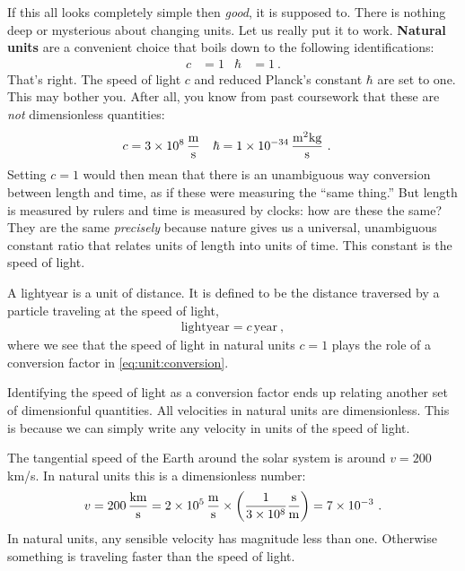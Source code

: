 \documentclass[12pt, oneside]{report}    %
\begin{document}
If this all looks completely simple then \emph{good}, it is supposed to. There is nothing deep or mysterious about changing units. Let us really put it to work. \textbf{Natural units} are a convenient choice that boils down to the following identifications:
\begin{align}
    c &=1  &
    \hbar &= 1
    \ .
\end{align}
That's right. The speed of light $c$ and reduced Planck's constant $\hbar$ are set to one. This may bother you. After all, you know from past coursework that these are \emph{not} dimensionless quantities:
\begin{align}
    c &= 3\times 10^{8}\,\frac{\textnormal{m}}{\textnormal{s}}
    &
    \hbar &= 1\times 10^{-34}\,\frac{\textnormal{m}^2 \textnormal{kg}}{\textnormal{s}} \ .
    \label{eq:c:hbar:SI}
\end{align}
Setting $c = 1$ would then mean that there is an unambiguous way conversion between length and time, as if these were measuring the ``same thing.'' But length is measured by rulers and time is measured by clocks: how are these the same? They are the same \emph{precisely} because nature gives us a universal, unambiguous constant ratio that relates units of length into units of time. This constant is the speed of light.
\begin{example}
A lightyear is a unit of distance. It is defined to be the distance traversed by a particle traveling at the speed of light,
\begin{align}
    \text{lightyear} = c\, \text{year} \ ,
\end{align}
where we see that the speed of light in natural units $c=1$ plays the role of a conversion factor in \eqref{eq:unit:conversion}. 
\end{example}
Identifying the speed of light as a conversion factor ends up relating another set of dimensionful quantities. All velocities in natural units are dimensionless. This is because we can simply write any velocity in units of the speed of light.
\begin{example}
The tangential speed of the Earth around the solar system is around $v = 200$\,km/s. In natural units this is a dimensionless number:
\begin{align}
v = 200\,\frac{ \textnormal{km} }{ \textnormal{s} }
=
2\times 10^{5} \, \frac{\textnormal{m}}{\textnormal{s}} 
\times 
\left(\frac{1}{3\times 10^8}\frac{\textnormal{s}}{\textnormal{m}}\right)
= 7 \times 10^{-3} \ .
\end{align}
In natural units, any sensible velocity has magnitude less than one. Otherwise something is traveling faster than the speed of light. 
\end{example}
\end{document}
